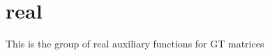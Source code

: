 \hypertarget{group__realGTauxiliary}{}\section{real}
\label{group__realGTauxiliary}
This is the group of real auxiliary functions for G\+T matrices 